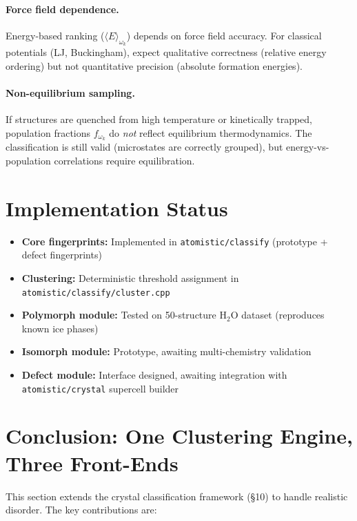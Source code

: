 \documentclass[11pt]{article}
\begin{document}
\paragraph{Force field dependence.}
Energy-based ranking ($\langle E \rangle_{\omega_k}$) depends on force field accuracy.
For classical potentials (LJ, Buckingham), expect qualitative correctness
(relative energy ordering) but not quantitative precision (absolute formation energies).

\paragraph{Non-equilibrium sampling.}
If structures are quenched from high temperature or kinetically trapped, population
fractions $f_{\omega_k}$ do \emph{not} reflect equilibrium thermodynamics. The
classification is still valid (microstates are correctly grouped), but
energy-vs-population correlations require equilibration.

\section{Implementation Status}

\begin{itemize}
  \item \textbf{Core fingerprints:} Implemented in \texttt{atomistic/classify}
        (prototype + defect fingerprints)
  \item \textbf{Clustering:} Deterministic threshold assignment in
        \texttt{atomistic/classify/cluster.cpp}
  \item \textbf{Polymorph module:} Tested on 50-structure H$_2$O dataset
        (reproduces known ice phases)
  \item \textbf{Isomorph module:} Prototype, awaiting multi-chemistry validation
  \item \textbf{Defect module:} Interface designed, awaiting integration with
        \texttt{atomistic/crystal} supercell builder
\end{itemize}

\section{Conclusion: One Clustering Engine, Three Front-Ends}

This section extends the crystal classification framework (\S10) to handle
realistic disorder. The key contributions are:
\end{document}
